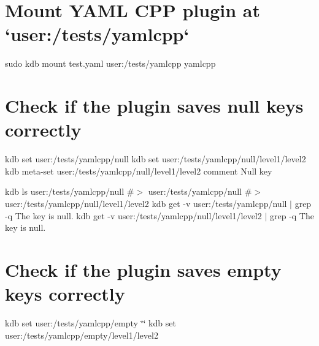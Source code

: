  \hypertarget{autotoc_md817_autotoc_md881}{}\section{Mount Y\+A\+M\+L C\+P\+P plugin at `user\+:/tests/yamlcpp`}\label{autotoc_md817_autotoc_md881}
sudo kdb mount test.\+yaml user\+:/tests/yamlcpp yamlcpp\hypertarget{autotoc_md817_autotoc_md882}{}\section{Check if the plugin saves null keys correctly}\label{autotoc_md817_autotoc_md882}
kdb set user\+:/tests/yamlcpp/null kdb set user\+:/tests/yamlcpp/null/level1/level2 kdb meta-\/set user\+:/tests/yamlcpp/null/level1/level2 comment \textquotesingle{}Null key\textquotesingle{}

kdb ls user\+:/tests/yamlcpp/null \#$>$ user\+:/tests/yamlcpp/null \#$>$ user\+:/tests/yamlcpp/null/level1/level2 kdb get -\/v user\+:/tests/yamlcpp/null $\vert$ grep -\/q \textquotesingle{}The key is null.\textquotesingle{} kdb get -\/v user\+:/tests/yamlcpp/null/level1/level2 $\vert$ grep -\/q \textquotesingle{}The key is null.\textquotesingle{}\hypertarget{autotoc_md817_autotoc_md883}{}\section{Check if the plugin saves empty keys correctly}\label{autotoc_md817_autotoc_md883}
kdb set user\+:/tests/yamlcpp/empty \char`\"{}\char`\"{} kdb set user\+:/tests/yamlcpp/empty/level1/level2

